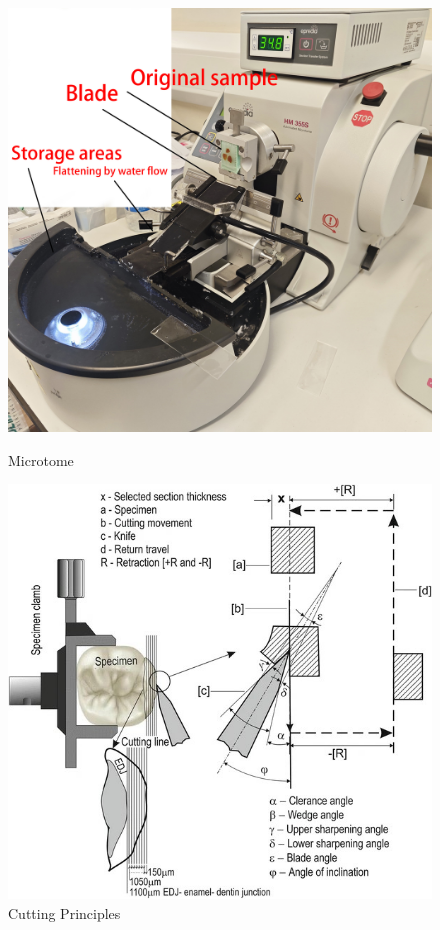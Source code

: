 \begin{figure}[H]
    \centering
    \begin{minipage}{0.35\textwidth}
        \centering
        \includegraphics[width=\textwidth]{./fig/machine - 副本.jpg}
        \caption{Microtome}
        \label{fig:machine}
    \end{minipage}
    \begin{minipage}{0.35\textwidth}
        \centering
        \includegraphics[width=\textwidth]{./fig/10266_2018_353_Fig1_HTML.jpg}
        \caption{Cutting Principles}
        \label{fig:cutting_machine}
    \end{minipage}
\end{figure}

